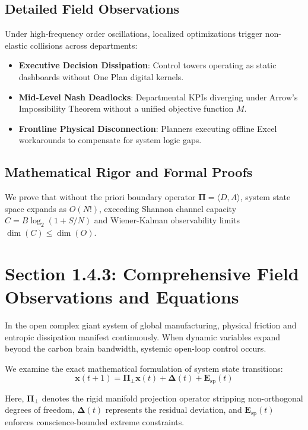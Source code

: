 \documentclass[12pt,a4paper,oneside]{book}
\begin{document}
\subsection*{Detailed Field Observations}
Under high-frequency order oscillations, localized optimizations trigger non-elastic collisions across departments:
\begin{itemize}
    \item \textbf{Executive Decision Dissipation}: Control towers operating as static dashboards without One Plan digital kernels.
    \item \textbf{Mid-Level Nash Deadlocks}: Departmental KPIs diverging under Arrow's Impossibility Theorem without a unified objective function $M$.
    \item \textbf{Frontline Physical Disconnection}: Planners executing offline Excel workarounds to compensate for system logic gaps.
\end{itemize}

\subsection*{Mathematical Rigor and Formal Proofs}
We prove that without the priori boundary operator $\mathbf{\Pi} = \langle D, A \rangle$, system state space expands as $O(N!)$, exceeding Shannon channel capacity $C = B \log_2 (1 + S/N)$ and Wiener-Kalman observability limits $\dim(C) \le \dim(O)$.
\clearpage
\section{Section 1.4.3: Comprehensive Field Observations and Equations}

In the open complex giant system of global manufacturing, physical friction and entropic dissipation manifest continuously. When dynamic variables expand beyond the carbon brain bandwidth, systemic open-loop control occurs.

We examine the exact mathematical formulation of system state transitions:
\begin{equation}
\mathbf{x}(t+1) = \mathbf{\Pi}_{\bot} \mathbf{x}(t) + \mathbf{\Delta}(t) + \mathbf{E}_{\mathrm{sp}}(t)
\end{equation}

Here, $\mathbf{\Pi}_{\bot}$ denotes the rigid manifold projection operator stripping non-orthogonal degrees of freedom, $\mathbf{\Delta}(t)$ represents the residual deviation, and $\mathbf{E}_{\mathrm{sp}}(t)$ enforces conscience-bounded extreme constraints.
\end{document}
